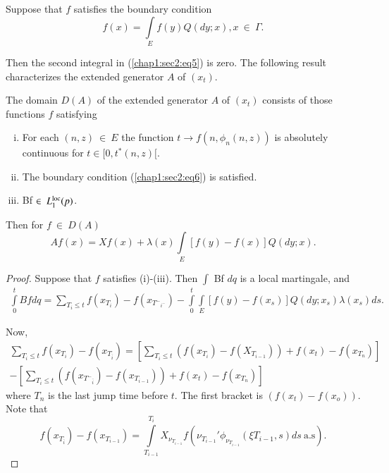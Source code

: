 Suppose that $f$ satisfies the boundary condition 
\begin{equation*}
  f (x) = \int\limits_{E} f (y) Q (dy; x), x ~\in  ~
  \Gamma. \tag{6}\label{chap1:sec2:eq6} 
\end{equation*}

Then the second integral in (\ref{chap1:sec2:eq5}) is zero. The
following result characterizes the extended generator $A$ of $(x_t)$.  

\begin{theorem} %
  The domain  $D(A)$ of the extended generator  $A$ of $(x_t)$ consists
  of those functions $f$ satisfying  
  \begin{enumerate}[(i)]
  \item For each  $(n,z)~\in ~ E$   the function 
    $t \to f (n, \phi_n (n, z))$ is absolutely continuous for 
    $t \in  [0, t^* (n, z)[$.  

    \item The boundary condition (\ref{chap1:sec2:eq6}) is satisfied.

    \item Bf $\in ~ L^{\operatorname{loc}}_1 (p)$.
  \end{enumerate}
  Then for $f~ \in ~ D (A)$
  \begin{equation*}
    Af(x) = Xf(x) + \lambda (x) \int\limits_{E} [f(y) - f(x)] Q (dy;
    x).\tag{7}\label{chap1:sec2:eq7} 
  \end{equation*}
\end{theorem}

\begin{proof}
  Suppose that $f$ satisfies (i)-(iii). Then $\int$ Bf $dq$ is a
  local martingale, and  
{\fontsize{10pt}{12pt}\selectfont
  \begin{gather*}
    \int\limits_0^t Bf dq =\sum_{T_i \leq t } f (x_{T_i}) - f(x_{{T^-}_{i^-}})
    -\int\limits^t_0 \int\limits_{E} [f (y) - f (x_s )] Q (dy; x_s)
    \lambda (x_s ) ds. 
  \end{gather*}}\relax

  Now,\pageoriginale 
  \begin{multline*}
    \sum_{T_i \leq t } f(x_{T_i}) - f(x_{T_{\bar{i}}}) = \left[ \sum_{T_i
        \leq t } (f (x_{T_i }) - f(X_{T_{i-1}})) + f (x_t) - f
      (x_{T_n})\right]\\ 
    -\left[\sum_{T_i \leq t } (f(x_{{T^-}_{\bar{i}}}) - f(x_{T_{i-1}})) + f
      (x_t) - f (x_{T_n})\right] 
  \end{multline*}
  where $T_n $ is the last jump time before $t$. The first bracket is
  $(f(x_t)- f(x_o))$. Note that  
  $$
  f(x_{T_{\bar{i}}}) - f(x_{T_{i - 1}}) = \int\limits^{T_i}_{T_{i -
      1}} X_{\nu_{T_{i-1}}} f (\nu_{T_{i - 1}}' \phi_{\nu_{T_{i - 1}}} (\xi
  T_{i - 1},s) ds~ \text{a.s}).   
  $$
\end{proof}

